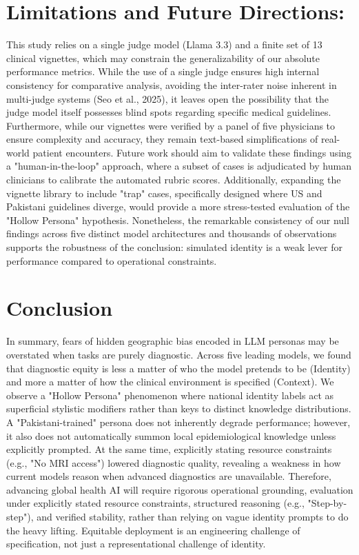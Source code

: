 \documentclass[sigconf]{acmart}
\begin{document}
\section{Limitations and Future Directions:}
This study relies on a single judge model (Llama 3.3) and a finite set of 13 clinical vignettes, which may constrain the generalizability of our absolute performance metrics. While the use of a single judge ensures high internal consistency for comparative analysis, avoiding the inter-rater noise inherent in multi-judge systems (Seo et al., 2025), it leaves open the possibility that the judge model itself possesses blind spots regarding specific medical guidelines. Furthermore, while our vignettes were verified by a panel of five physicians to ensure complexity and accuracy, they remain text-based simplifications of real-world patient encounters.
Future work should aim to validate these findings using a "human-in-the-loop" approach, where a subset of cases is adjudicated by human clinicians to calibrate the automated rubric scores. Additionally, expanding the vignette library to include "trap" cases, specifically designed where US and Pakistani guidelines diverge, would provide a more stress-tested evaluation of the "Hollow Persona" hypothesis. Nonetheless, the remarkable consistency of our null findings across five distinct model architectures and thousands of observations supports the robustness of the conclusion: simulated identity is a weak lever for performance compared to operational constraints.


\section{Conclusion}
In summary, fears of hidden geographic bias encoded in LLM personas may be overstated when tasks are purely diagnostic. Across five leading models, we found that diagnostic equity is less a matter of who the model pretends to be (Identity) and more a matter of how the clinical environment is specified (Context).
We observe a "Hollow Persona" phenomenon where national identity labels act as superficial stylistic modifiers rather than keys to distinct knowledge distributions. A "Pakistani-trained" persona does not inherently degrade performance; however, it also does not automatically summon local epidemiological knowledge unless explicitly prompted. At the same time, explicitly stating resource constraints (e.g., "No MRI access") lowered diagnostic quality, revealing a weakness in how current models reason when advanced diagnostics are unavailable. Therefore, advancing global health AI will require rigorous operational grounding, evaluation under explicitly stated resource constraints, structured reasoning (e.g., "Step-by-step"), and verified stability, rather than relying on vague identity prompts to do the heavy lifting. Equitable deployment is an engineering challenge of specification, not just a representational challenge of identity.
\end{document}

